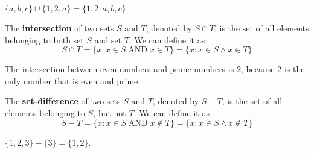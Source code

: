 \myexample
{
	$\{a,b,c\} \cup \{1,2,a\} = \{1,2,a,b,c\}$
}

\mydefine
{
	The {\bf intersection} of two sets $S$ and $T$, denoted by $S\cap T$, is the set of all elements belonging to both set $S$ and set $T$. We can define it as
	\[
		S \cap T = \{ x : x \in S \;\text{AND}\; x \in T\} = \{ x : x \in S \wedge x \in T\}
	\]
}

\myexample
{
	The intersection between even numbers and prime numbers is ${2}$, because 2 is the only number that is even and prime.
}

\mydefine
{
	The {\bf set-difference} of two sets $S$ and $T$, denoted by $S-T$, is the set of all elements belonging to $S$, but not $T$. We can define it as
	\[
		S-T = \{x : x \in S \;\text{AND}\; x \notin T\} = \{x : x \in S \wedge x \notin T\}
	\]
}

\myexample
{
	$\{1,2,3\} - \{3\} = \{1,2\}$.
}
